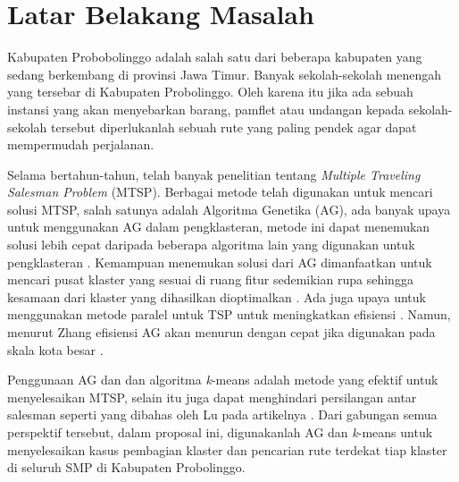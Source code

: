 \section{Latar Belakang Masalah}

Kabupaten Probobolinggo adalah salah satu dari beberapa kabupaten yang sedang berkembang di provinsi Jawa Timur. Banyak sekolah-sekolah menengah yang tersebar di Kabupaten Probolinggo. Oleh karena itu jika ada sebuah instansi yang akan menyebarkan barang, pamflet atau undangan kepada sekolah-sekolah tersebut diperlukanlah sebuah rute yang paling pendek agar dapat mempermudah perjalanan.

Selama bertahun-tahun, telah banyak penelitian tentang \textit{Multiple Traveling Salesman Problem} (MTSP). Berbagai metode telah digunakan untuk mencari solusi MTSP, salah satunya adalah Algoritma Genetika (AG), ada banyak upaya untuk menggunakan AG dalam pengklasteran, metode ini dapat menemukan solusi lebih cepat daripada beberapa algoritma lain yang digunakan untuk pengklasteran \cite{krishna1999genetic}. Kemampuan menemukan solusi dari AG dimanfaatkan untuk mencari pusat klaster yang sesuai di ruang fitur sedemikian rupa sehingga kesamaan dari klaster yang dihasilkan dioptimalkan \cite{maii2000genetic}. Ada juga upaya untuk menggunakan metode paralel untuk TSP untuk meningkatkan efisiensi \cite{li2016parallel}. Namun, menurut Zhang efisiensi AG akan menurun dengan cepat jika digunakan pada skala kota besar \cite{zhang2014parallel}. 

Penggunaan AG dan dan algoritma \textit{k}-means adalah metode yang efektif untuk menyelesaikan MTSP, selain itu juga dapat menghindari persilangan antar salesman seperti yang dibahas oleh Lu pada artikelnya \cite{inproceedings}. Dari gabungan semua perspektif tersebut, dalam proposal ini, digunakanlah AG dan \textit{k}-means untuk menyelesaikan kasus pembagian klaster dan pencarian rute terdekat tiap klaster di seluruh SMP di Kabupaten Probolinggo.